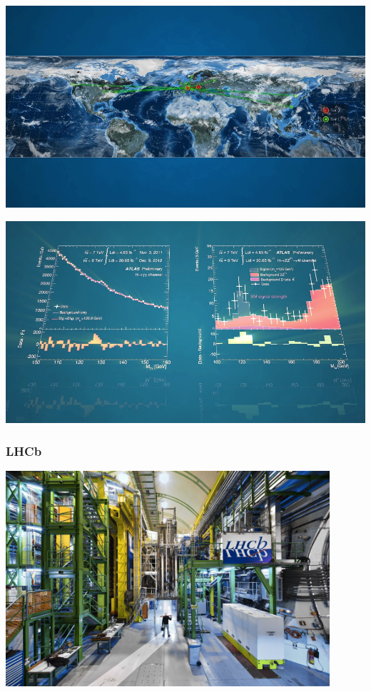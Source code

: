 \documentclass{beamer}
\begin{document}
\begin{frame}
    \includegraphics[width=\textwidth]{video/grid.png}
\end{frame}

\begin{frame}
    \includegraphics[width=\textwidth]{video/graphs.png}
\end{frame}

\begin{frame}
    \frametitle{LHCb}

    \centering
    \includegraphics[width=0.90\textwidth]{LHCb.jpg}
\end{frame}
\end{document}
